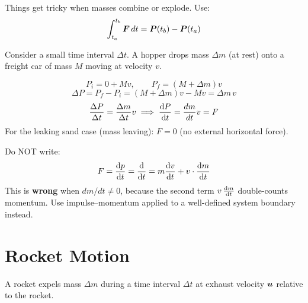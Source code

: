 Things get tricky when masses combine or explode. Use:
\[
    \int_{t_a}^{t_b}\vect{F}\,dt = \vect{P}(t_b) - \vect{P}(t_a)
\]

\begin{example}
Consider a small time interval $\Delta t$. A hopper drops mass $\Delta m$ (at rest) onto a freight car of mass $M$ moving at velocity $v$.

\[
    P_i = 0 + Mv, \qquad P_f = (M + \Delta m)v
\]
\[
    \Delta P = P_f - P_i = (M + \Delta m)v - Mv = \Delta m\,v
\]
\[
    \frac{\Delta P}{\Delta t} = \frac{\Delta m}{\Delta t}v \implies \dv{P}{t} = \frac{dm}{dt}v = F
\]
For the leaking sand case (mass leaving): $F = 0$ (no external horizontal force).
\end{example}

\begin{fact}
Do NOT write:
\[
    F = \dv{p}{t} = \dv{}{t}(mv) = m\dv{v}{t} + v\cdot\dv{m}{t}
\]
This is \textbf{wrong} when $dm/dt \neq 0$, because the second term $v\,\dv{m}{t}$ double-counts momentum. Use impulse--momentum applied to a well-defined system boundary instead.
\end{fact}

\section{Rocket Motion}

A rocket expels mass $\Delta m$ during a time interval $\Delta t$ at exhaust velocity $\bm{u}$ relative to the rocket.

